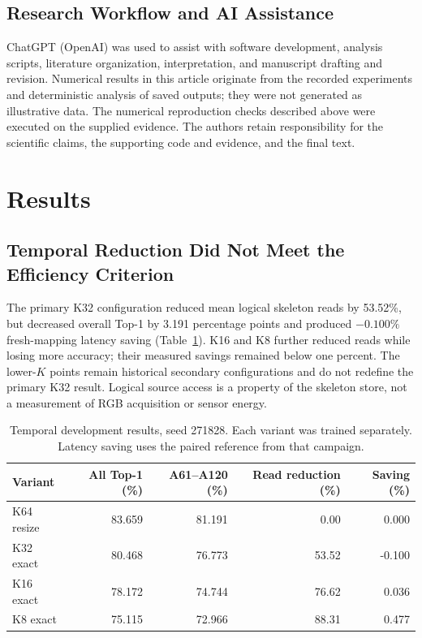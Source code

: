 \documentclass[ai,article,submit,moreauthors]{Definitions/mdpi}
\begin{document}
\subsection{Research Workflow and AI Assistance}
ChatGPT (OpenAI) was used to assist with software development, analysis scripts, literature organization, interpretation, and manuscript drafting and revision. Numerical results in this article originate from the recorded experiments and deterministic analysis of saved outputs; they were not generated as illustrative data. The numerical reproduction checks described above were executed on the supplied evidence. The authors retain responsibility for the scientific claims, the supporting code and evidence, and the final text.

\section{Results}

\subsection{Temporal Reduction Did Not Meet the Efficiency Criterion}

The primary K32 configuration reduced mean logical skeleton reads by 53.52\%,
but decreased overall Top-1 by 3.191 percentage points and produced
$-0.100\%$ fresh-mapping latency saving (Table~\ref{tab:temporal}).
K16 and K8 further reduced reads while losing more accuracy; their measured
savings remained below one percent. The lower-$K$ points remain historical
secondary configurations and do not redefine the primary K32 result.
Logical source access is a property of the skeleton store, not a measurement
of RGB acquisition or sensor energy.

\begin{table}[H]
\centering\small\setlength{\tabcolsep}{3pt}
\caption{Temporal development results, seed 271828. Each variant was trained
separately. Latency saving uses the paired reference from that campaign.}
\label{tab:temporal}
\begin{tabular}{lrrrr}
\toprule
Variant & All Top-1 (\%) & A61--A120 (\%) & Read reduction (\%) & Saving (\%)\\
\midrule
K64 resize & 83.659 & 81.191 & 0.00 & 0.000\\
K32 exact & 80.468 & 76.773 & 53.52 & -0.100\\
K16 exact & 78.172 & 74.744 & 76.62 & 0.036\\
K8 exact & 75.115 & 72.966 & 88.31 & 0.477\\
\bottomrule
\end{tabular}
\end{table}
\end{document}
